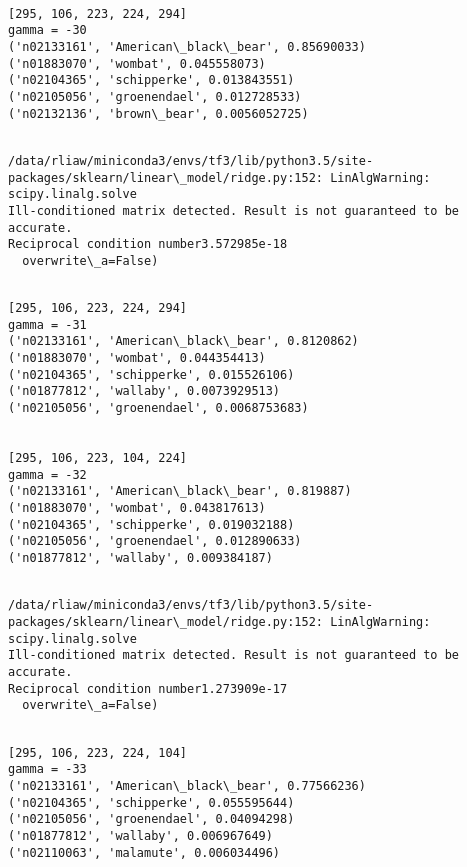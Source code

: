 \documentclass[11pt]{article}
\begin{document}
    \begin{Verbatim}[commandchars=\\\{\}]

[295, 106, 223, 224, 294]
gamma = -30
('n02133161', 'American\_black\_bear', 0.85690033)
('n01883070', 'wombat', 0.045558073)
('n02104365', 'schipperke', 0.013843551)
('n02105056', 'groenendael', 0.012728533)
('n02132136', 'brown\_bear', 0.0056052725)


    \end{Verbatim}

    \begin{Verbatim}[commandchars=\\\{\}]
/data/rliaw/miniconda3/envs/tf3/lib/python3.5/site-packages/sklearn/linear\_model/ridge.py:152: LinAlgWarning: scipy.linalg.solve
Ill-conditioned matrix detected. Result is not guaranteed to be accurate.
Reciprocal condition number3.572985e-18
  overwrite\_a=False)

    \end{Verbatim}

    \begin{Verbatim}[commandchars=\\\{\}]

[295, 106, 223, 224, 294]
gamma = -31
('n02133161', 'American\_black\_bear', 0.8120862)
('n01883070', 'wombat', 0.044354413)
('n02104365', 'schipperke', 0.015526106)
('n01877812', 'wallaby', 0.0073929513)
('n02105056', 'groenendael', 0.0068753683)


[295, 106, 223, 104, 224]
gamma = -32
('n02133161', 'American\_black\_bear', 0.819887)
('n01883070', 'wombat', 0.043817613)
('n02104365', 'schipperke', 0.019032188)
('n02105056', 'groenendael', 0.012890633)
('n01877812', 'wallaby', 0.009384187)


    \end{Verbatim}

    \begin{Verbatim}[commandchars=\\\{\}]
/data/rliaw/miniconda3/envs/tf3/lib/python3.5/site-packages/sklearn/linear\_model/ridge.py:152: LinAlgWarning: scipy.linalg.solve
Ill-conditioned matrix detected. Result is not guaranteed to be accurate.
Reciprocal condition number1.273909e-17
  overwrite\_a=False)

    \end{Verbatim}

    \begin{Verbatim}[commandchars=\\\{\}]

[295, 106, 223, 224, 104]
gamma = -33
('n02133161', 'American\_black\_bear', 0.77566236)
('n02104365', 'schipperke', 0.055595644)
('n02105056', 'groenendael', 0.04094298)
('n01877812', 'wallaby', 0.006967649)
('n02110063', 'malamute', 0.006034496)


    \end{Verbatim}
\end{document}
